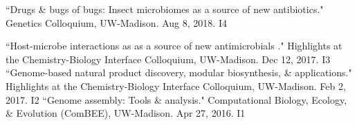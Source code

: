 
\begin{cvpubs} 
  \cvpub
    {``Drugs \& bugs of bugs: Insect microbiomes as a source of new antibiotics." Genetics Colloquium, UW-Madison. Aug 8, 2018.} %
    {I4} %
\end{cvpubs}
\begin{cvpubs}
  \cvpub
    {``Host-microbe interactions as as a source of new antimicrobials
." Highlights at the Chemistry-Biology Interface Colloquium, UW-Madison. Dec 12, 2017.} %
    {I3} %
  \cvpub
    {``Genome-based natural product discovery, modular biosynthesis, \& applications." Highlights at the Chemistry-Biology Interface Colloquium, UW-Madison. Feb 2, 2017.} %
    {I2} %
  \cvpub
    {``Genome assembly: Tools \& analysis." Computational Biology, Ecology, \& Evolution (ComBEE), UW-Madison. Apr 27, 2016.} %
    {I1} %
\end{cvpubs}



